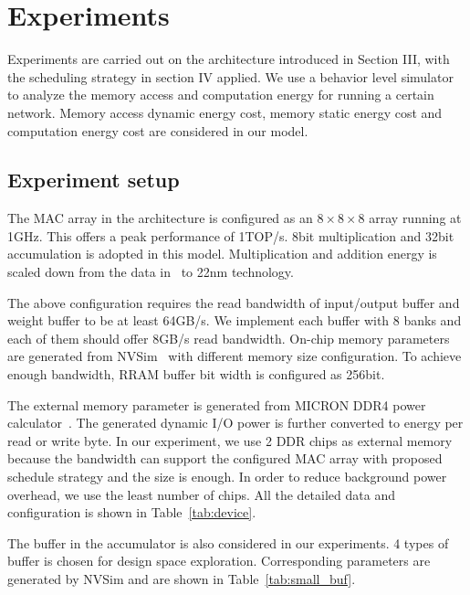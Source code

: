 \section{Experiments}\label{sec:exp}



Experiments are carried out on the architecture introduced in Section III, with the scheduling strategy in section IV applied. We use a behavior level simulator to analyze the memory access and computation energy for running a certain network. Memory access dynamic energy cost, memory static energy cost and computation energy cost are considered in our model.

\subsection{Experiment setup}
The MAC array in the architecture is configured as an $8\times8\times8$ array running at 1GHz. This offers a peak performance of 1TOP/s. 8bit multiplication and 32bit accumulation is adopted in this model. Multiplication and addition energy is scaled down from the data in~\cite{mac_energy} to 22nm technology. 

The above configuration requires the read bandwidth of input/output buffer and weight buffer to be at least 64GB/s. We implement each buffer with 8 banks and each of them should offer 8GB/s read bandwidth. On-chip memory parameters are generated from NVSim~\cite{dong2014nvsim} with different memory size configuration. To achieve enough bandwidth, RRAM buffer bit width is configured as 256bit. 

The external memory parameter is generated from MICRON DDR4 power calculator~\cite{powercalc}. The generated dynamic I/O power is further converted to energy per read or write byte. In our experiment, we use 2 DDR chips as external memory because the bandwidth can support the configured MAC array with proposed schedule strategy and the size is enough. In order to reduce background power overhead, we use the least number of chips. All the detailed data and configuration is shown in Table~\ref{tab:device}. 

The buffer in the accumulator is also considered in our experiments. 4 types of buffer is chosen for design space exploration. Corresponding parameters are generated by NVSim and are shown in Table~\ref{tab:small_buf}.




